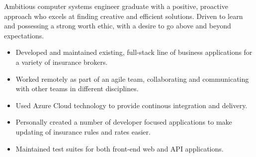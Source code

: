 \documentclass[10pt,a4paper,ragged2e,withhyper]{altacv}
\begin{document}



\makecvheader


Ambitious computer systems engineer graduate with a positive, proactive approach who excels at finding creative and efficient solutions. Driven to learn and possessing a strong worth ethic, with a desire to go above and beyond expectations.


\begin{itemize}
	\item Developed and maintained existing, full-stack line of business applications for a variety of insurance brokers.
	\item Worked remotely as part of an agile team, collaborating and communicating with other teams in different disciplines.
	\item Used Azure Cloud technology to provide continous integration and delivery.
	\item Personally created a number of developer focused applications to make updating of insurance rules and rates easier.
	\item Maintained test suites for both front-end web and API applications.
\end{itemize}
\end{document}
